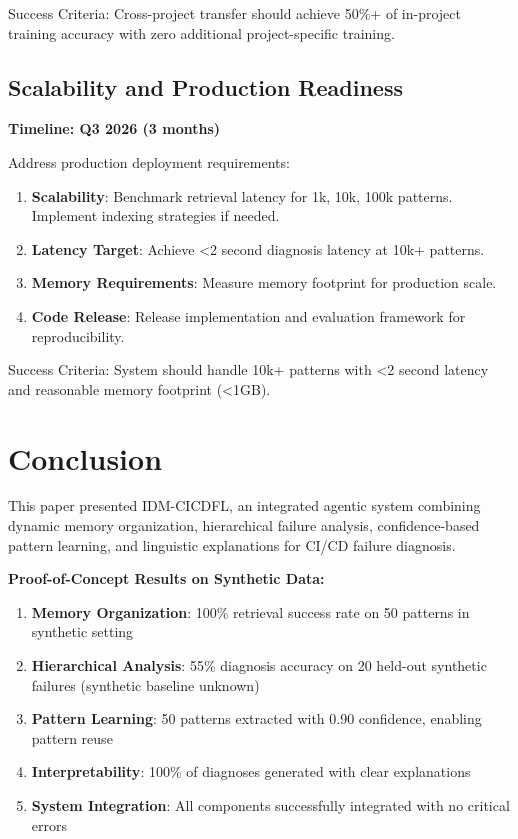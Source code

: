 \documentclass[11pt]{article}
\begin{document}
Success Criteria: Cross-project transfer should achieve 50\%+ of in-project training accuracy with zero additional project-specific training.

\subsection{Scalability and Production Readiness}

\textbf{Timeline: Q3 2026 (3 months)}

Address production deployment requirements:

\begin{enumerate}
    \item \textbf{Scalability}: Benchmark retrieval latency for 1k, 10k, 100k patterns. Implement indexing strategies if needed.

    \item \textbf{Latency Target}: Achieve <2 second diagnosis latency at 10k+ patterns.

    \item \textbf{Memory Requirements}: Measure memory footprint for production scale.

    \item \textbf{Code Release}: Release implementation and evaluation framework for reproducibility.
\end{enumerate}

Success Criteria: System should handle 10k+ patterns with <2 second latency and reasonable memory footprint (<1GB).

\section{Conclusion}

This paper presented IDM-CICDFL, an integrated agentic system combining dynamic memory organization, hierarchical failure analysis, confidence-based pattern learning, and linguistic explanations for CI/CD failure diagnosis.

\textbf{Proof-of-Concept Results on Synthetic Data:}

\begin{enumerate}
    \item \textbf{Memory Organization}: 100\% retrieval success rate on 50 patterns in synthetic setting

    \item \textbf{Hierarchical Analysis}: 55\% diagnosis accuracy on 20 held-out synthetic failures (synthetic baseline unknown)

    \item \textbf{Pattern Learning}: 50 patterns extracted with 0.90 confidence, enabling pattern reuse

    \item \textbf{Interpretability}: 100\% of diagnoses generated with clear explanations

    \item \textbf{System Integration}: All components successfully integrated with no critical errors
\end{enumerate}
\end{document}
